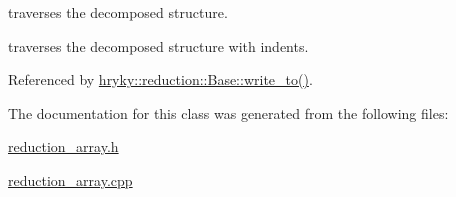traverses the decomposed structure. 

traverses the decomposed structure with indents. 

Referenced by \hyperlink{classhryky_1_1reduction_1_1_base_a709cc7c48e1c90fe253739e46d82aa19}{hryky\-::reduction\-::\-Base\-::write\-\_\-to()}.



The documentation for this class was generated from the following files\-:\begin{DoxyCompactItemize}
\item 
\hyperlink{reduction__array_8h}{reduction\-\_\-array.\-h}\item 
\hyperlink{reduction__array_8cpp}{reduction\-\_\-array.\-cpp}\end{DoxyCompactItemize}
